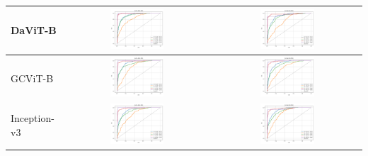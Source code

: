 \begin{table}[!htbp]
\begin{tabular}{|l|c|c|}
        DaViT-B & \includegraphics[width=0.38\textwidth]{figs/auc_roc/davit_base-msft_in1k_auc_roc_cross_entropy.png} & \includegraphics[width=0.38\textwidth]{figs/auc_roc/davit_base-msft_in1k_auc_roc_corn.png} \\ \hline
        GCViT-B & \includegraphics[width=0.38\textwidth]{figs/auc_roc/gcvit_base-in1k_auc_roc_cross_entropy.png} & \includegraphics[width=0.38\textwidth]{figs/auc_roc/gcvit_base-in1k_auc_roc_corn.png} \\ \hline
        Inception-v3 & \includegraphics[width=0.38\textwidth]{figs/auc_roc/inception_v3_auc_roc_cross_entropy.png} & \includegraphics[width=0.38\textwidth]{figs/auc_roc/inception_v3_auc_roc_corn.png} \\ \hline

\end{tabular}
\end{table}
